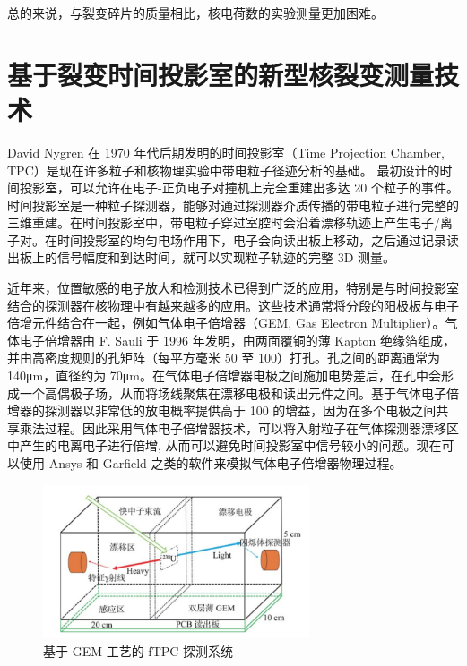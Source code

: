 \documentclass[AutoFakeBold]{LZUThesis}
\begin{document}
总的来说，与裂变碎片的质量相比，核电荷数的实验测量更加困难。






\section{基于裂变时间投影室的新型核裂变测量技术}
David Nygren 在 1970 年代后期发明的时间投影室（Time Projection Chamber, TPC）是现在许多粒子和核物理实验中带电粒子径迹分析的基础\cite{nygren1978time}。
最初设计的时间投影室，可以允许在电子-正负电子对撞机上完全重建出多达 20 个粒子的事件。
时间投影室是一种粒子探测器，能够对通过探测器介质传播的带电粒子进行完整的三维重建。在时间投影室中，带电粒子穿过室腔时会沿着漂移轨迹上产生电子/离子对。在时间投影室的均匀电场作用下，电子会向读出板上移动，之后通过记录读出板上的信号幅度和到达时间，就可以实现粒子轨迹的完整 3D 测量。

近年来，位置敏感的电子放大和检测技术已得到广泛的应用，特别是与时间投影室结合的探测器在核物理中有越来越多的应用。这些技术通常将分段的阳极板与电子倍增元件结合在一起，例如气体电子倍增器（GEM, Gas Electron Multiplier）\cite{fenker2008bonus, sauli2016gas}。气体电子倍增器由 F. Sauli 于 1996 年发明，由两面覆铜的薄 Kapton 绝缘箔组成，并由高密度规则的孔矩阵（每平方毫米 50 至 100）打孔。孔之间的距离通常为 140μm，直径约为 70μm。在气体电子倍增器电极之间施加电势差后，在孔中会形成一个高偶极子场，从而将场线聚焦在漂移电极和读出元件之间。基于气体电子倍增器的探测器以非常低的放电概率提供高于 100 的增益，因为在多个电极之间共享乘法过程。因此采用气体电子倍增器技术，可以将入射粒子在气体探测器漂移区中产生的电离电子进行倍增, 从而可以避免时间投影室中信号较小的问题。现在可以使用 Ansys 和 Garfield 之类的软件来模拟气体电子倍增器物理过程。

\begin{figure}[H]
    \centering
    \includegraphics[width=0.7\textwidth]{figures/GEM-TPC.png}
    \caption{基于 GEM 工艺的 fTPC 探测系统\cite{魏康2019基于GEM工艺的裂变时间投影室中裂变碎片的讨论}}
    \label{fig_GEM-TPC}
\end{figure}
\end{document}
